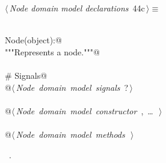 \documentclass[
    a4paper,      %
    10pt,         %
    openright,    %
    notitlepage,  %
    parskip=half, %
]{scrreprt}       %
\theoremstyle{definition}                    %
\begin{document}
\begin{flushleft} \small
\begin{minipage}{\linewidth}\label{scrap57}\raggedright\small
{} $\langle\,${\itshape Node domain model declarations}\nobreak\ {\footnotesize {44c}}$\,\rangle\equiv$
\vspace{-1ex}
\begin{list}{}{} \item
\mbox{}\lstinline@@\\
\mbox{}\lstinline@class Node(object):@\\
\mbox{}\lstinline@    """Represents a node."""@\\
\mbox{}\lstinline@@\\
\mbox{}\lstinline@    # Signals@\\
\mbox{}\lstinline@    @\hbox{$\langle\,${\itshape Node domain model signals}\nobreak\ {\footnotesize ?}$\,\rangle$}\lstinline@@\\
\mbox{}\lstinline@@\\
\mbox{}\lstinline@    @\hbox{$\langle\,${\itshape Node domain model constructor}\nobreak\ {\footnotesize {}, \ldots\ }$\,\rangle$}\lstinline@@\\
\mbox{}\lstinline@@\\
\mbox{}\lstinline@    @\hbox{$\langle\,${\itshape Node domain model methods}\nobreak\ {\footnotesize {}}$\,\rangle$}\lstinline@@\\
\mbox{}\lstinline@@{\NWsep}
\end{list}
\vspace{-1.5ex}
\footnotesize
\begin{list}{}{\setlength{\itemsep}{-\parsep}\setlength{\itemindent}{-\leftmargin}}
\item \NWtxtMacroRefIn\ .

\item{}
\end{list}
\end{minipage}\vspace{4ex}
\end{flushleft}
\end{document}
